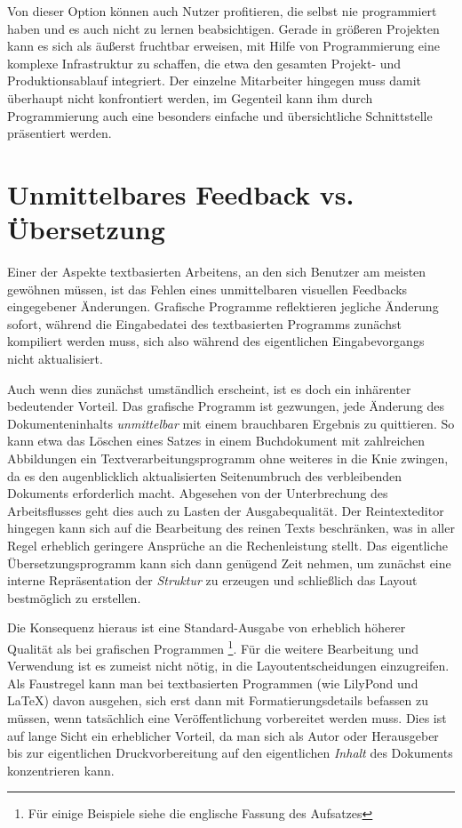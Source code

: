 \documentclass[DIV=12]{scrreprt}
\begin{document}
Von dieser Option können auch Nutzer profitieren, die selbst nie programmiert haben und es auch nicht zu lernen beabsichtigen.
Gerade in größeren Projekten kann es sich als äußerst fruchtbar erweisen, mit Hilfe von Programmierung eine komplexe Infrastruktur zu schaffen, die etwa den gesamten Projekt- und Produktionsablauf integriert.
Der einzelne Mitarbeiter hingegen muss damit überhaupt nicht konfrontiert werden, im Gegenteil kann ihm durch Programmierung auch eine besonders einfache und übersichtliche Schnittstelle präsentiert werden.


\section{Unmittelbares Feedback vs. Übersetzung}
\label{sec:pt_compiling-instant}
Einer der Aspekte textbasierten Arbeitens, an den sich Benutzer am meisten gewöhnen müssen, ist das Fehlen eines unmittelbaren visuellen Feedbacks eingegebener Änderungen.
Grafische Programme reflektieren jegliche Änderung sofort, während die Eingabedatei des textbasierten Programms zunächst kompiliert werden muss, sich also während des eigentlichen Eingabevorgangs nicht aktualisiert.

Auch wenn dies zunächst umständlich erscheint, ist es doch ein inhärenter bedeutender Vorteil.
Das grafische Programm ist gezwungen, jede Änderung des Dokumenteninhalts \emph{unmittelbar} mit einem brauchbaren Ergebnis zu quittieren.
So kann etwa das Löschen eines Satzes in einem Buchdokument mit zahlreichen Abbildungen ein Textverarbeitungsprogramm ohne weiteres in die Knie zwingen, da es den augenblicklich aktualisierten Seitenumbruch des verbleibenden Dokuments erforderlich macht.
Abgesehen von der Unterbrechung des Arbeitsflusses geht dies auch zu Lasten der Ausgabequalität.
Der Reintexteditor hingegen kann sich auf die Bearbeitung des reinen Texts beschränken, was in aller Regel erheblich geringere Ansprüche an die Rechenleistung stellt.
Das eigentliche Übersetzungsprogramm kann sich dann genügend Zeit nehmen, um zunächst eine interne Repräsentation der \emph{Struktur} zu erzeugen und schließlich das Layout bestmöglich zu erstellen.

Die Konsequenz hieraus ist eine Standard-Ausgabe von erheblich höherer Qualität als bei grafischen Programmen%
\footnote{Für einige Beispiele siehe die englische Fassung des Aufsatzes}.
Für die weitere Bearbeitung und Verwendung ist es zumeist nicht nötig, in die Layout\-entscheidungen einzugreifen.
Als Faustregel kann man bei textbasierten Programmen (wie LilyPond und \LaTeX) davon ausgehen, sich erst dann mit Formatierungsdetails befassen zu müssen, wenn tatsächlich eine Veröffentlichung vorbereitet werden muss.
Dies ist auf lange Sicht ein erheblicher Vorteil, da man sich als Autor oder Herausgeber bis zur eigentlichen Druckvorbereitung auf den eigentlichen \emph{Inhalt} des Dokuments konzentrieren kann.
\end{document}
